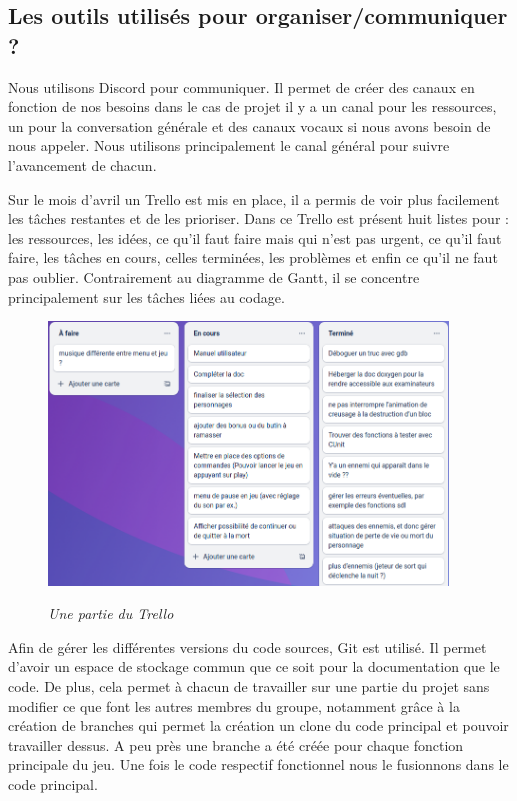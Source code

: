 \documentclass[a4paper,12pt]{article}
\begin{document}
\subsection{Les outils utilisés pour organiser/communiquer ?}
Nous utilisons Discord pour communiquer. Il permet de créer des canaux en fonction de nos besoins dans le cas de projet il y a un canal pour les ressources, un pour la conversation générale et des canaux vocaux si nous avons besoin de nous appeler. Nous utilisons principalement le canal général pour suivre l’avancement de chacun.

Sur le mois d’avril un Trello est mis en place, il a permis de voir plus facilement les tâches restantes et de les prioriser. Dans ce Trello est présent huit listes pour : les ressources, les idées, ce qu’il faut faire mais qui n’est pas urgent, ce qu’il faut faire, les tâches en cours, celles terminées, les problèmes et enfin ce qu’il ne faut pas oublier. Contrairement au diagramme de Gantt, il se concentre principalement sur les tâches liées au codage.

\begin{figure}[h]
\begin{center}
\includegraphics[height=7cm]{img/capture_trello.png}\\
\caption{{\emph{Une partie du Trello}}}
\label{trello}
\end{center}
\end{figure}

Afin de gérer les différentes versions du code sources, Git est utilisé. Il permet d’avoir un espace de stockage commun que ce soit pour la documentation que le code. De plus, cela permet à chacun de travailler sur une partie du projet sans modifier ce que font les autres membres du groupe, notamment grâce à la création de branches qui permet la création un clone du code principal et pouvoir travailler dessus. A peu près une branche a été créée pour chaque fonction principale du jeu. Une fois le code respectif fonctionnel nous le fusionnons dans le code principal.
\end{document}
